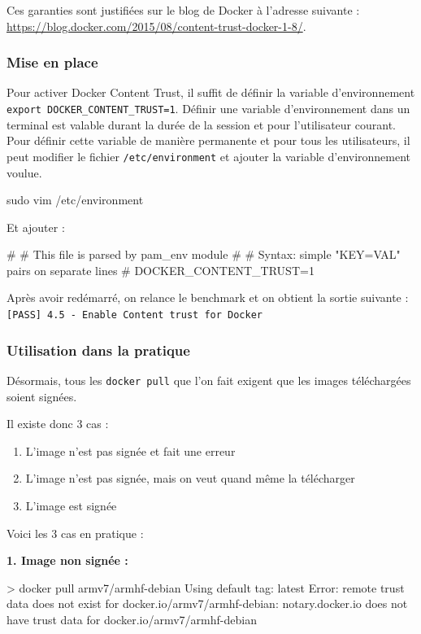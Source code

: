 \documentclass[11pt,a4paper,oneside]{report}
\newcommand{\code}[1]{\texttt{#1}}
\begin{document}
Ces garanties sont justifiées sur le blog de Docker à l'adresse suivante : \url{https://blog.docker.com/2015/08/content-trust-docker-1-8/}.

\subsubsection{Mise en place}
Pour activer Docker Content Trust, il suffit de définir la variable d'environnement \linebreak \code{export DOCKER\_CONTENT\_TRUST=1}. Définir une variable d'environnement dans un terminal est valable durant la durée de la session et pour l'utilisateur courant. Pour définir cette variable de manière permanente et pour tous les utilisateurs, il peut modifier le fichier \code{/etc/environment} et ajouter la variable d'environnement voulue.

\begin{bashcode}
sudo vim /etc/environment
\end{bashcode}

Et ajouter :
\begin{bashcode}
#
# This file is parsed by pam_env module
#
# Syntax: simple "KEY=VAL" pairs on separate lines
#
DOCKER_CONTENT_TRUST=1
\end{bashcode}

Après avoir redémarré, on relance le benchmark et on obtient la sortie suivante : \code{[PASS] 4.5  - Enable Content trust for Docker}

\subsubsection{Utilisation dans la pratique}
Désormais, tous les \code{docker pull} que l'on fait exigent que les images téléchargées soient signées.

Il existe donc 3 cas :
\begin{enumerate}
\item L'image n'est pas signée et fait une erreur
\item L'image n'est pas signée, mais on veut quand même la télécharger
\item L'image est signée
\end{enumerate}

Voici les 3 cas en pratique :

\textbf{1. Image non signée :}
\begin{textcode}
> docker pull armv7/armhf-debian
Using default tag: latest
Error: remote trust data does not exist for docker.io/armv7/armhf-debian: notary.docker.io does not have trust data for docker.io/armv7/armhf-debian
\end{textcode}
\end{document}
